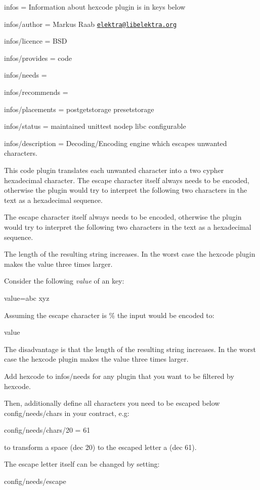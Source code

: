 
\begin{DoxyItemize}
\item infos = Information about hexcode plugin is in keys below
\item infos/author = Markus Raab \href{mailto:elektra@libelektra.org}{\tt elektra@libelektra.\+org}
\item infos/licence = B\+SD
\item infos/provides = code
\item infos/needs =
\item infos/recommends =
\item infos/placements = postgetstorage presetstorage
\item infos/status = maintained unittest nodep libc configurable
\item infos/description = Decoding/\+Encoding engine which escapes unwanted characters.
\end{DoxyItemize}

This code plugin translates each unwanted character into a two cypher hexadecimal character. The escape character itself always needs to be encoded, otherwise the plugin would try to interpret the following two characters in the text as a hexadecimal sequence.


\begin{DoxyItemize}
\item The escape character itself always needs to be encoded, otherwise the plugin would try to interpret the following two characters in the text as a hexadecimal sequence.
\item The length of the resulting string increases. In the worst case the hexcode plugin makes the value three times larger.
\end{DoxyItemize}

Consider the following {\itshape value} of an key\+:


\begin{DoxyCode}
value=abc xyz
\end{DoxyCode}


Assuming the escape character is \% the input would be encoded to\+:


\begin{DoxyCode}
value%
\end{DoxyCode}


The disadvantage is that the length of the resulting string increases. In the worst case the hexcode plugin makes the value three times larger.

Add {\ttfamily hexcode} to {\ttfamily infos/needs} for any plugin that you want to be filtered by hexcode.

Then, additionally define all characters you need to be escaped below {\ttfamily config/needs/chars} in your contract, e.\+g\+:


\begin{DoxyCode}
config/needs/chars/20 = 61
\end{DoxyCode}


to transform a space (dec 20) to the escaped letter a (dec 61).

The escape letter itself can be changed by setting\+:


\begin{DoxyCode}
config/needs/escape
\end{DoxyCode}
 